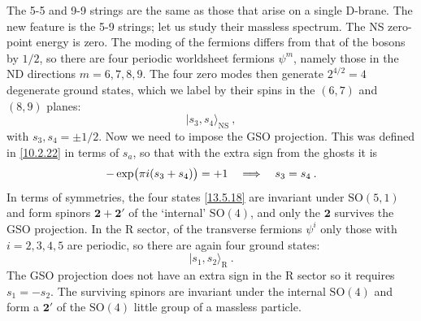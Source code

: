 The 5-5 and 9-9 strings are the same as those that arise on a single D-brane. The new feature is the 5-9 strings; let us study their massless spectrum. The NS zero-point energy is zero. The moding of the fermions differs from that of the bosons by $1/2$, so there are four periodic worldsheet fermions $\psi^m$, namely those in the ND directions $m = 6, 7, 8, 9$. The four zero modes then generate $2^{4/2} = 4$ degenerate ground states, which we label by their spins in the $(6,7)$ and $(8,9)$ planes:
\begin{equation}
	\lvert s_3, s_4\rangle_{\mathrm{NS}} \:, \label{13.5.18}
\end{equation}
with $s_3, s_4 = \pm 1/2$. Now we need to impose the GSO projection. This was defined in \eqref{10.2.22} in terms of $s_a$, so that with the extra sign from the ghosts it is
\begin{equation}
	-\exp\bigl(\pi i(s_3 + s_4)\bigr) = +1 \quad \Longrightarrow \quad s_3 = s_4 \:. \label{13.5.19}
\end{equation}
In terms of symmetries, the four states \eqref{13.5.18} are invariant under $\mathrm{SO}(5,1)$ and form spinors $\mathbf{2} + \mathbf{2}'$ of the `internal' $\mathrm{SO}(4)$, and only the $\mathbf{2}$ survives the GSO projection. In the R sector, of the transverse fermions $\psi^i$ only those with $i = 2, 3, 4, 5$ are periodic, so there are again four ground states:
\begin{equation}
	\lvert s_1, s_2\rangle_{\mathrm{R}} \:. \label{13.5.20}
\end{equation}
The GSO projection does not have an extra sign in the R sector so it requires $s_1 = -s_2$. The surviving spinors are invariant under the internal $\mathrm{SO}(4)$ and form a $\mathbf{2}'$ of the $\mathrm{SO}(4)$ little group of a massless particle.
